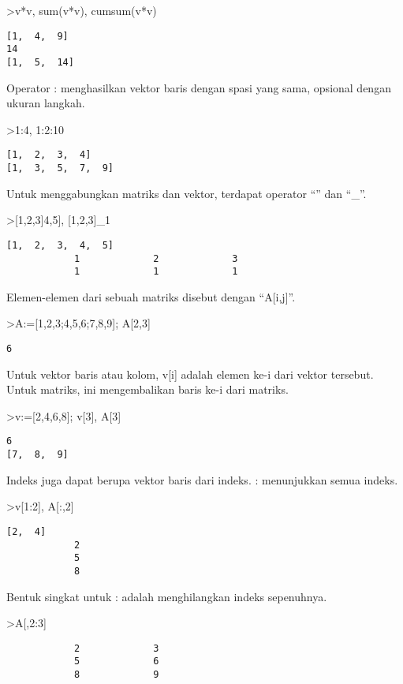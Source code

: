 \documentclass[
]{book}
\begin{document}
\textgreater v*v, sum(v*v), cumsum(v*v)

\begin{verbatim}
[1,  4,  9]
14
[1,  5,  14]
\end{verbatim}

Operator : menghasilkan vektor baris dengan spasi yang sama, opsional dengan ukuran langkah.

\textgreater1:4, 1:2:10

\begin{verbatim}
[1,  2,  3,  4]
[1,  3,  5,  7,  9]
\end{verbatim}

Untuk menggabungkan matriks dan vektor, terdapat operator ``\textbar{}'' dan ``\_''.

\textgreater{[}1,2,3{]}\textbar{[}4,5{]}, {[}1,2,3{]}\_1

\begin{verbatim}
[1,  2,  3,  4,  5]
            1             2             3 
            1             1             1 
\end{verbatim}

Elemen-elemen dari sebuah matriks disebut dengan ``A{[}i,j{]}''.

\textgreater A:={[}1,2,3;4,5,6;7,8,9{]}; A{[}2,3{]}

\begin{verbatim}
6
\end{verbatim}

Untuk vektor baris atau kolom, v{[}i{]} adalah elemen ke-i dari vektor tersebut. Untuk matriks, ini mengembalikan baris ke-i dari matriks.

\textgreater v:={[}2,4,6,8{]}; v{[}3{]}, A{[}3{]}

\begin{verbatim}
6
[7,  8,  9]
\end{verbatim}

Indeks juga dapat berupa vektor baris dari indeks. : menunjukkan semua indeks.

\textgreater v{[}1:2{]}, A{[}:,2{]}

\begin{verbatim}
[2,  4]
            2 
            5 
            8 
\end{verbatim}

Bentuk singkat untuk : adalah menghilangkan indeks sepenuhnya.

\textgreater A{[},2:3{]}

\begin{verbatim}
            2             3 
            5             6 
            8             9 
\end{verbatim}
\end{document}
